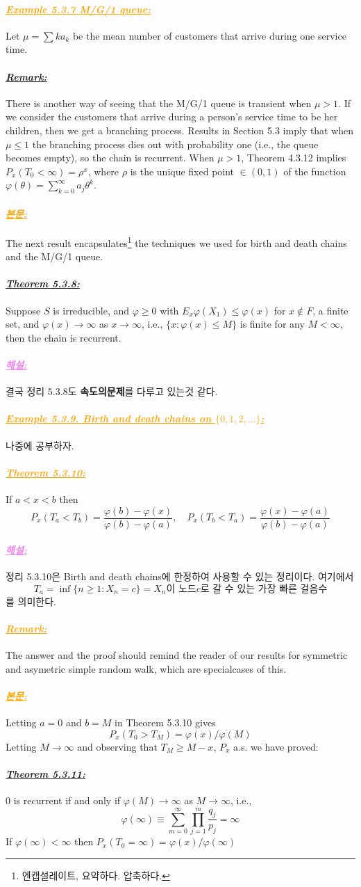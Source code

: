 \documentclass[12pt,oneside,english,a4paper]{article}
\newcommand{\para}[1]{\paragraph{\LARGE\it\underline{\textbf{#1:}}}\LARGE}
\newcommand{\paraviolet}[1]{\paragraph{\LARGE\textcolor{violet}{\it\underline{\textbf{#1:}}}}\LARGE}
\newcommand{\paraorange}[1]{\paragraph{\LARGE\textcolor{orange}{\it\underline{\textbf{#1:}}}}\LARGE}
\begin{document}
\paraorange{Example 5.3.7 M/G/1 queue} Let $\mu=\sum k a_k$ be the mean number of customers that arrive during one service time. 

\para{Remark} There is another way of seeing that the M/G/1 queue is
transient when $\mu>1$. If we consider the customers that arrive during a
person’s service time to be her children, then we get a branching process.
Results in Section 5.3 imply that when $\mu\leq 1$ the branching process dies out with probability one (i.e., the queue becomes empty), so the chain is recurrent. When $\mu>1$, Theorem 4.3.12 implies $P_x(T_0<\infty)=\rho^x$, where $\rho$ is the unique fixed point $\in (0,1)$ of the function $\varphi(\theta)=\sum_{k=0}^{\infty}a_j\theta^k$.

\paraorange{본문} The next result encapsulates\footnote{엔캡설레이트, 요약하다. 압축하다.} the techniques we used for birth and death chains and the M/G/1 queue. 

\para{Theorem 5.3.8} Suppose $S$ is irreducible, and $\varphi\geq 0$ with $E_x \varphi(X_1)\leq \varphi(x)$ for $x \notin F$, a finite set, and $\varphi(x)\to \infty$ as $x \to \infty$, i.e., $\{x : \varphi(x) \leq M \}$ is finite for any $M < \infty$, then the chain is recurrent.

\paraviolet{해설} 결국 정리 5.3.8도 {\bf 속도의문제}를 다루고 있는것 같다. 

\paraorange{Example 5.3.9. Birth and death chains on $\{0,1,2,...\}$} 나중에 공부하자.

\paraorange{Theorem 5.3.10} If $a<x<b$ then 
\[
P_x(T_a<T_b)=\frac{\varphi(b)-\varphi(x)}{\varphi(b)-\varphi(a)}, \quad P_x(T_b<T_a)=\frac{\varphi(x)-\varphi(a)}{\varphi(b)-\varphi(a)}
\]

\paraviolet{해설} 정리 5.3.10은 Birth and death chains에 한정하여 사용할 수 있는 정리이다. 여기에서 
\[
T_a=\inf \{n\geq 1 : X_n=c\}=\mbox{$X_n$이 노드$c$로 갈 수 있는 가장 빠른 걸음수}
\]
를 의미한다. 

\paraorange{Remark} The answer and the proof should remind the reader of our results for symmetric and asymetric simple random walk, which are specialcases of this.

\paraorange{본문} Letting $a=0$ and $b=M$ in Theorem 5.3.10 gives 
\[
P_x(T_0>T_M)=\varphi(x)/\varphi(M)
\]
Letting $M\to \infty$ and observing that $T_M\geq M-x$, $P_x$ a.s. we have proved:


\para{Theorem 5.3.11} $0$ is recurrent if and only if $\varphi(M)\to \infty$ as $M\to \infty$, i.e., 
\[
\varphi(\infty) \equiv \sum_{m=0}^{\infty}\prod_{j=1}^{m}\frac{q_j}{p_j}=\infty
\]
If $\varphi(\infty)<\infty$ then $P_x(T_0=\infty)=\varphi(x)/\varphi(\infty)$
\end{document}
